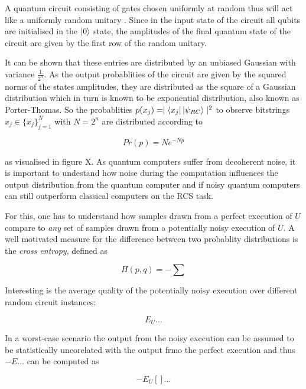 A quantum circuit consisting of gates chosen uniformly at random thus
will act like a uniformly random unitary
\cite{}. Since in the input state of the circuit all
qubits are initialised in the $\Ket{0}$ state, the amplitudes of the final
quantum state of the circuit are given by the first row of the random unitary.

It can be shown that these entries are distributed by an unbiased Gaussian with
variance $\frac{1}{2^n}$. As the output probablities of the circuit are given by
the squared norms of the states amplitudes, they are distributed as the square of
a Gaussian distribution which in turn is known to be exponential distribution,
also known as Porter-Thomas. So the probablities $p(x_j) =
\mid \Bra{x_j}\Ket{\psi_{RC}} \mid ^2$ to observe bitstrings $x_j \in \{x_j\}_{j=1}^N$ with
$N=2^n$ are distributed according to

\begin{equation}
  Pr(p) = N e^{-Np}
\end{equation}

as visualised in figure X. As quantum computers suffer from decoherent noise, it is
important to undestand how noise during the computation influences the output
distribution from the quantum computer and if noisy quantum computers can still
outperform classical computers on the RCS task.

For this, one has to understand how samples drawn from a perfect execution of
$U$ compare to \textit{any} set of samples drawn from a potentially noisy
execution of $U$. A well motivated measure for the difference between two
probablity distributions is the \textit{cross entropy}, defined as


\begin{equation}
  H(p,q) = - \sum
\end{equation}

Interesting is the average quality of the potentially noisy execution over
different random circuit instances:

\begin{equation}
  E_U \dots
\end{equation}

In a worst-case scenario the output from the noisy execution can be assumed to
be statistically uncorelated with the output frmo the perfect execution and thus
$-E...$ can be computed as

\begin{equation}
  - E_U[]\dots
\end{equation}

